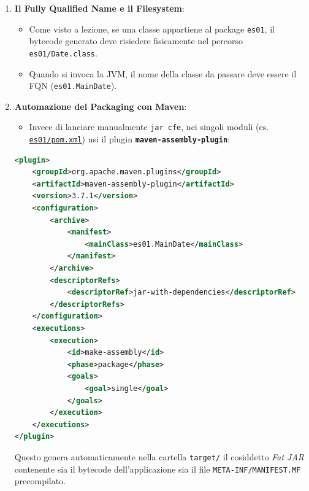 \documentclass[11pt,a4paper]{article}
\newcommand{\passthrough}[1]{#1}
\providecommand{\tightlist}{\setlength{\itemsep}{0pt}\setlength{\parskip}{0pt}}
\begin{document}
\begin{enumerate}
\def\labelenumi{\arabic{enumi}.}
\tightlist
\item
  \textbf{Il Fully Qualified Name e il Filesystem}:

  \begin{itemize}
  \tightlist
  \item
    Come visto a lezione, se una classe appartiene al package
    \passthrough{\lstinline!es01!}, il bytecode generato deve risiedere
    fisicamente nel percorso \passthrough{\lstinline!es01/Date.class!}.
  \item
    Quando si invoca la JVM, il nome della classe da passare deve essere
    il FQN (\passthrough{\lstinline!es01.MainDate!}).
  \end{itemize}
\item
  \textbf{Automazione del Packaging con Maven}:

  \begin{itemize}
  \tightlist
  \item
    Invece di lanciare manualmente \passthrough{\lstinline!jar cfe!},
    nei singoli moduli (es.
    \href{file:///home/wally/Documenti/GitHub/Programmazione-II/25-26/esercizi-wally-25-26/es01/pom.xml}{\passthrough{\lstinline!es01/pom.xml!}})
    usi il plugin
    \textbf{\passthrough{\lstinline!maven-assembly-plugin!}}:
  \end{itemize}

\begin{lstlisting}[language=XML]
<plugin>
    <groupId>org.apache.maven.plugins</groupId>
    <artifactId>maven-assembly-plugin</artifactId>
    <version>3.7.1</version>
    <configuration>
        <archive>
            <manifest>
                <mainClass>es01.MainDate</mainClass>
            </manifest>
        </archive>
        <descriptorRefs>
            <descriptorRef>jar-with-dependencies</descriptorRef>
        </descriptorRefs>
    </configuration>
    <executions>
        <execution>
            <id>make-assembly</id>
            <phase>package</phase>
            <goals>
                <goal>single</goal>
            </goals>
        </execution>
    </executions>
</plugin>
\end{lstlisting}

  Questo genera automaticamente nella cartella
  \passthrough{\lstinline!target/!} il cosiddetto \emph{Fat JAR}
  contenente sia il bytecode dell'applicazione sia il file
  \passthrough{\lstinline!META-INF/MANIFEST.MF!} precompilato.
\end{enumerate}
\end{document}
